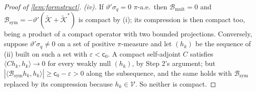 \begin{proof}[Proof of \cref{lem:formstruct}]
\emph{(iv).} If $\vartheta'\sigma_q=0$ $\pi$-a.e.\ then $\mathcal B_{\mathrm{mult}}=0$ and
$\mathcal B_{\mathrm{sym}}=-\vartheta'(\tilde{\mathcal K}+\tilde{\mathcal K}^{\ast})$ is compact by (i);
its compression is then compact too, being a product of a compact operator with two bounded projections.
Conversely, suppose $\vartheta'\sigma_q\ne0$ on a set of positive $\pi$-measure and let $(h_k)$ be the
sequence of (ii) built on such a set with $\varepsilon<\mathsf c_0$. A compact self-adjoint $C$ satisfies
$\langle Ch_k,h_k\rangle\to0$ for every weakly null $(h_k)$, by Step 2's argument; but
$|\langle\mathcal B_{\mathrm{sym}}h_k,h_k\rangle|\ge\mathsf c_0-\varepsilon>0$ along the subsequence, and
the same holds with $\mathcal B_{\mathrm{sym}}$ replaced by its compression because
$h_k\in\mathcal V$. So neither is compact.


\end{proof}

